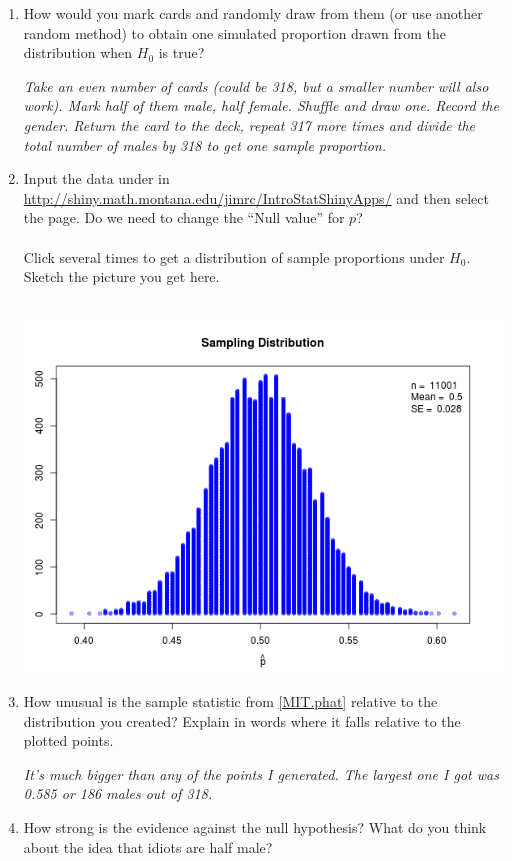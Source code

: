 \begin{enumerate}
\begin{enumerate}
    \item How would you mark cards and randomly draw from them (or use
      another random method) to
      obtain one simulated proportion drawn from the distribution when
      $H_0$ is true?
\begin{students}
    \vspace{3cm}    
\end{students}
\begin{key} 
  {\it Take an even number of cards (could be 318, but a
    smaller number will also work). Mark half of them male, half
    female. Shuffle and draw one. Record the gender. Return the card
    to the deck, repeat 317 more times and divide the total number of
    males by 318 to get one sample proportion.}
\end{key}
    \item Input the data under  in 
      \url{http://shiny.math.montana.edu/jimrc/IntroStatShinyApps/}
      and then select the   page.  Do we need to change the
      ``Null value'' for $p$?\\ \ \\
      Click  several times to get a distribution of sample
      proportions under $H_0$. 
      Sketch the picture you get here.
\begin{students}
    \vspace{5cm}    
\end{students}
\begin{key}
\ \  \\ \includegraphics[width=.3\linewidth]{../plots/MIT-null.png}
\end{key}
  \item How unusual is the sample statistic from \ref{MIT.phat}
    relative to the distribution you created?  Explain in words where
    it falls relative to the plotted points.
\begin{students}
    \vspace{3cm}    
\end{students}

\begin{key}
{\it It's much bigger than any of the points I generated. The largest
  one I got was 0.585 or 186 males out of 318.}
\end{key} 
\item  How strong is the evidence against the null hypothesis?  What
  do you think about the idea that idiots are half male?
\begin{students}
    \vspace{2cm}    
\end{students}


\end{enumerate}
\end{enumerate}
